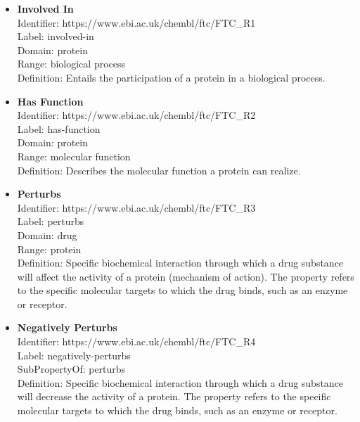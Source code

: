 \documentclass{bioinfo}
\begin{document}
\begin{itemize}
\item \textbf{Involved In} \\
Identifier: https://www.ebi.ac.uk/chembl/ftc/FTC\_R1 \\
Label: involved-in \\
Domain: protein \\
Range: biological process \\
Definition: Entails the participation of a protein in a biological process. \\
\end{itemize}

\begin{itemize}
\item \textbf{Has Function} \\
Identifier: https://www.ebi.ac.uk/chembl/ftc/FTC\_R2 \\
Label: has-function \\
Domain: protein \\
Range: molecular function \\
Definition: Describes the molecular function a protein can realize. \\
\end{itemize}

\begin{itemize}
\item \textbf{Perturbs} \\
Identifier: https://www.ebi.ac.uk/chembl/ftc/FTC\_R3 \\
Label: perturbs \\
Domain: drug \\
Range: protein \\
Definition: Specific biochemical interaction through which a drug substance 
will affect the activity of a protein (mechanism of action). The property refers to the specific molecular 
targets to which the drug binds, such as an enzyme or receptor.
\end{itemize}

\begin{itemize}
\item \textbf{Negatively Perturbs} \\
Identifier: https://www.ebi.ac.uk/chembl/ftc/FTC\_R4 \\
Label: negatively-perturbs \\
SubPropertyOf: perturbs \\
Definition: Specific biochemical interaction through which a drug substance will decrease the activity of a protein. 
The property refers to the specific molecular targets to which the drug binds, such as an enzyme or receptor.
\end{itemize}
\end{document}
